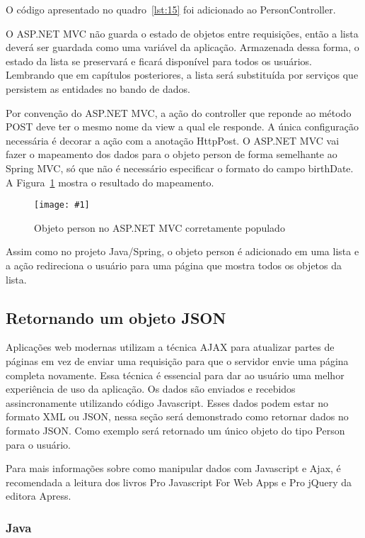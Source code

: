 \documentclass[a4paper,12pt]{article}
\newcommand{\figura}[3] {
	\begin{figure}[ht]
		\centering
		\texttt{[image: \#1]}
		\caption{#2}
		\label{#3}
	\end{figure}
	\FloatBarrier
}
\newcommand{\sharpcode}[3] {
	
}
\begin{document}
O código apresentado no quadro~\ref{lst:15} foi adicionado ao PersonController.

\sharpcode{code/15.txt}{PersonController do projeto ASP.NET com nova ação}{lst:15}

O ASP.NET MVC não guarda o estado de objetos entre requisições, então a lista deverá ser guardada como uma variável da aplicação. Armazenada dessa forma, o estado da lista se preservará e ficará disponível para todos os usuários. Lembrando que em capítulos posteriores, a lista será substituída por serviços que persistem as entidades no bando de dados.

Por convenção do ASP.NET MVC, a ação do controller que reponde ao método POST deve ter o mesmo nome da view a qual ele responde.  A única configuração necessária é decorar a ação com a anotação HttpPost. O ASP.NET MVC vai fazer o mapeamento dos dados para o objeto person de forma semelhante ao Spring MVC, só que não é necessário especificar o formato do campo birthDate. A Figura~\ref{fig:31} mostra o resultado do mapeamento.

\figura{31.png}{Objeto person no ASP.NET MVC corretamente populado}{fig:31}

Assim como no projeto Java/Spring, o objeto person é adicionado em uma lista e a ação redireciona o usuário para uma página que mostra todos os objetos da lista.

\subsection{Retornando um objeto JSON}

Aplicações web modernas utilizam a técnica AJAX para atualizar partes de páginas em vez de enviar uma requisição para que o servidor envie uma página completa novamente. Essa técnica é essencial para dar ao usuário uma melhor experiência de uso da aplicação. Os dados são enviados e recebidos assincronamente utilizando código Javascript. Esses dados podem estar no formato XML ou JSON, nessa seção será demonstrado como retornar dados no formato JSON. Como exemplo será retornado um único objeto do tipo Person para o usuário.

Para mais informações sobre como manipular dados com Javascript e Ajax, é recomendada a leitura dos livros Pro Javascript For Web Apps e Pro jQuery da editora Apress.

\subsubsection{Java}
\end{document}
